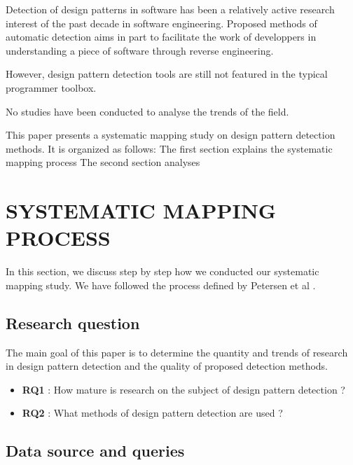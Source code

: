 \documentclass[letterpaper, 10 pt, conference]{ieeeconf}  %
\begin{document}
Detection of design patterns in software has been a relatively active research
interest of the past decade in software engineering.
Proposed methods of automatic detection aims in part to facilitate the work of
developpers in understanding a piece of software through reverse engineering.

However, design pattern detection tools are still not featured in the typical
programmer toolbox.

No studies have been conducted to analyse the trends of the field.

This paper presents a systematic mapping study on design pattern detection
methods.
It is organized as follows: 
 The first section explains the systematic mapping process
 The second section analyses



\section{SYSTEMATIC MAPPING PROCESS}

In this section, we discuss step by step how we conducted our systematic
mapping study.
We have followed the process defined by Petersen et al \cite{c1}. 

\subsection{Research question}

The main goal of this paper is to determine the quantity and trends of research
in design pattern detection and the quality of proposed detection methods.

\begin{itemize}
	\item \textbf{RQ1} : How mature is research on the subject of design pattern detection ?
	\item \textbf{RQ2} : What methods of design pattern detection are used ?
\end{itemize}


\subsection{Data source and queries}
\end{document}
